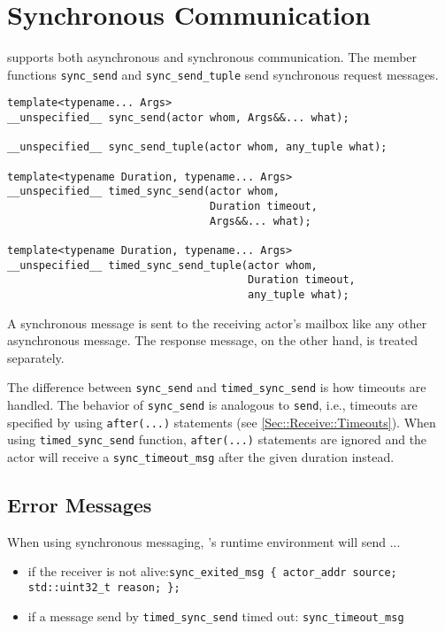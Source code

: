 \section{Synchronous Communication}
\label{Sec::Sync}

\lib supports both asynchronous and synchronous communication.
The member functions \lstinline^sync_send^ and \lstinline^sync_send_tuple^ send synchronous request messages.

\begin{lstlisting}
template<typename... Args>
__unspecified__ sync_send(actor whom, Args&&... what);

__unspecified__ sync_send_tuple(actor whom, any_tuple what);

template<typename Duration, typename... Args>
__unspecified__ timed_sync_send(actor whom,
                                Duration timeout,
                                Args&&... what);

template<typename Duration, typename... Args>
__unspecified__ timed_sync_send_tuple(actor whom,
                                      Duration timeout,
                                      any_tuple what);
\end{lstlisting}

A synchronous message is sent to the receiving actor's mailbox like any other asynchronous message.
The response message, on the other hand, is treated separately.

The difference between \lstinline^sync_send^ and \lstinline^timed_sync_send^ is how timeouts are handled.
The behavior of \lstinline^sync_send^ is analogous to \lstinline^send^, i.e., timeouts are specified by using \lstinline^after(...)^ statements (see \ref{Sec::Receive::Timeouts}).
When using \lstinline^timed_sync_send^ function, \lstinline^after(...)^ statements are ignored and the actor will receive a \lstinline^sync_timeout_msg^ after the given duration instead.

\subsection{Error Messages}

When using synchronous messaging, \lib's runtime environment will send ...

\begin{itemize}
\item if the receiver is not alive:\newline\lstinline^sync_exited_msg { actor_addr source; std::uint32_t reason; };^
\item if a message send by \lstinline^timed_sync_send^ timed out: \lstinline^sync_timeout_msg^
\end{itemize}

